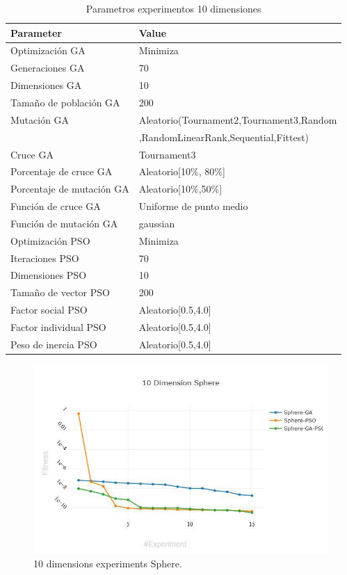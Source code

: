 \documentclass[runningheads]{llncs}
\begin{document}
    \begin{table}[htp]
      \caption{Parametros experimentos 10 dimensiones}
      \label{table:ga-pso-parameters-10}
      \centering
      \begin{tabular}{|l|l|}
      \hline
      Parameter & Value \\
      \hline
      \hline
      Optimizaci\'on GA & Minimiza \\
      \hline
      Generaciones GA & 70 \\
      \hline
      Dimensiones GA & 10 \\
      \hline
      Tama\~no de poblaci\'on GA & 200 \\
      \hline
      Mutaci\'on GA & Aleatorio(Tournament2,Tournament3,Random \\
      &  ,RandomLinearRank,Sequential,Fittest)\\
      \hline
      Cruce GA & Tournament3 \\
      \hline
      Porcentaje de cruce GA & Aleatorio[10\%, 80\%] \\
      \hline
      Porcentaje de mutaci\'on GA & Aleatorio[10\%,50\%] \\
      \hline
      Funci\'on de cruce GA & Uniforme de punto medio \\
      \hline
      Funci\'on de mutaci\'on GA & gaussian \\
      \hline
      Optimizaci\'on PSO & Minimiza \\
      \hline
      Iteraciones PSO & 70 \\
      \hline
      Dimensiones PSO & 10 \\
      \hline
      Tama\~no de vector PSO & 200 \\
      \hline
      Factor social PSO & Aleatorio[0.5,4.0] \\
      \hline
      Factor individual PSO & Aleatorio[0.5,4.0] \\
      \hline
      Peso de inercia PSO & Aleatorio[0.5,4.0] \\
      \hline
      \end{tabular}
      \end{table}
    
      \begin{figure}[htp]
        \includegraphics[width=\textwidth]{10-sphere.jpg}
        \caption{10 dimensions experiments Sphere.} \label{fig1}
        \end{figure}
\end{document}
